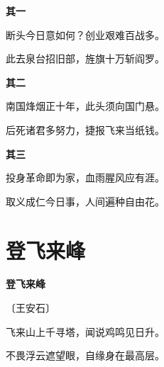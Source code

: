 \documentclass[12pt,UTF-8,openany,fontset=none]{ctexbook}
\begin{document}
\begin{center}
    \begin{Large}

        \textbf{其一}

        \vspace{12pt}  %

        断头今日意如何？创业艰难百战多。

        此去泉台招旧部，旌旗十万斩阎罗。

        \vspace{18pt}  %
        
        \textbf{其二}

        \vspace{12pt}  %

        南国烽烟正十年，此头须向国门悬。

        后死诸君多努力，捷报飞来当纸钱。

        \vspace{18pt}  %
        
        \textbf{其三}

        \vspace{12pt}  %

        投身革命即为家，血雨腥风应有涯。

        取义成仁今日事，人间遍种自由花。

    \end{Large}

\end{center}

\vspace{8pt}
\clearpage

\section{登飞来峰}


\begin{center}
    {\bfseries 登飞来峰}

    \vspace{18pt}

    \begin{large}\xuwen
        〔王安石〕
    \end{large}

\end{center}

    \vspace{18pt}  %

\begin{center}
    \begin{Large}

        飞来山上千寻塔，闻说鸡鸣见日升。

        不畏浮云遮望眼，自缘身在最高层。

    \end{Large}

\end{center}
\end{document}
